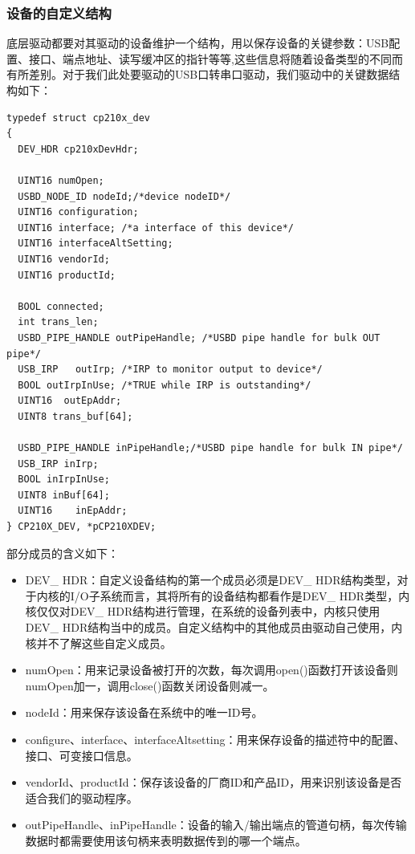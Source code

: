 \subsubsection{设备的自定义结构}
	底层驱动都要对其驱动的设备维护一个结构，用以保存设备的关键参数：USB配置、接口、端点地址、读写缓冲区的指针等等,这些信息将随着设备类型的不同而有所差别。对于我们此处要驱动的USB口转串口驱动，我们驱动中的关键数据结构如下： 
	
\lstset{language=C}
\begin{lstlisting}
typedef struct cp210x_dev
{
  DEV_HDR cp210xDevHdr;
  
  UINT16 numOpen;
  USBD_NODE_ID nodeId;/*device nodeID*/
  UINT16 configuration;	
  UINT16 interface; /*a interface of this device*/
  UINT16 interfaceAltSetting;
  UINT16 vendorId;
  UINT16 productId;

  BOOL connected;  
  int trans_len;
  USBD_PIPE_HANDLE outPipeHandle; /*USBD pipe handle for bulk OUT pipe*/
  USB_IRP	outIrp; /*IRP to monitor output to device*/
  BOOL outIrpInUse; /*TRUE while IRP is outstanding*/
  UINT16  outEpAddr;
  UINT8 trans_buf[64];

  USBD_PIPE_HANDLE inPipeHandle;/*USBD pipe handle for bulk IN pipe*/
  USB_IRP inIrp;
  BOOL inIrpInUse;
  UINT8 inBuf[64];
  UINT16 	inEpAddr;
} CP210X_DEV, *pCP210XDEV;
\end{lstlisting}
\noindent 部分成员的含义如下：

\begin{itemize}
\item DEV\_ HDR：自定义设备结构的第一个成员必须是DEV\_ HDR结构类型，对于内核的I/O子系统而言，其将所有的设备结构都看作是DEV\_ HDR类型，内核仅仅对DEV\_ HDR结构进行管理，在系统的设备列表中，内核只使用DEV\_ HDR结构当中的成员。自定义结构中的其他成员由驱动自己使用，内核并不了解这些自定义成员。
\item numOpen：用来记录设备被打开的次数，每次调用open()函数打开该设备则numOpen加一，调用close()函数关闭设备则减一。
\item nodeId：用来保存该设备在系统中的唯一ID号。
\item configure、interface、interfaceAltsetting：用来保存设备的描述符中的配置、接口、可变接口信息。
\item vendorId、productId：保存该设备的厂商ID和产品ID，用来识别该设备是否适合我们的驱动程序。
\item outPipeHandle、inPipeHandle：设备的输入/输出端点的管道句柄，每次传输数据时都需要使用该句柄来表明数据传到的哪一个端点。
\end{itemize}

